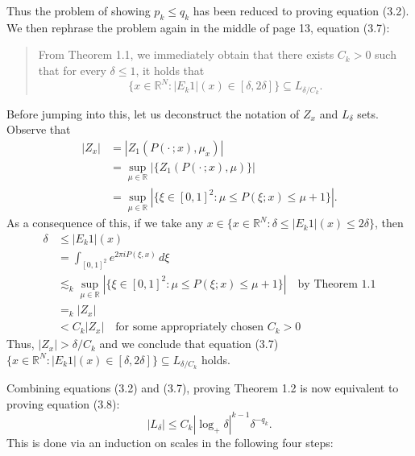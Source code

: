 \documentclass[12pt]{article}
\theoremstyle{definition}
\theoremstyle{remark}
\numberwithin{equation}{section}
\begin{document}
Thus the problem of showing $p_k\leq q_k$ has been reduced to proving equation (3.2).
We then rephrase the problem again in the middle of page 13, equation (3.7):
    \begin{quote}
        From Theorem 1.1, we immediately obtain that there exists $C_k>0$ such that for every $\delta \leq 1$, it holds that
        \begin{equation*}
            \{x\in \mathbb{R}^N \colon |E_k1|(x)\in [\delta,2\delta]\} \subseteq L_{\delta/C_k}.
        \end{equation*}
    \end{quote}
Before jumping into this, let us deconstruct the notation of $Z_x$ and $L_\delta$ sets. 
Observe that 
\begin{align*}
    |Z_x| &= |Z_1\left(P(\cdot\,;x),\mu_x\right)| \\
    &= \sup_{\mu\in\mathbb{R}}| \{Z_1\left(P(\cdot\,;x),\mu\right)\}| \\
    &= \sup_{\mu\in\mathbb{R}} | \{\xi\in[0,1]^2\colon \mu\leq P(\xi;x)\leq\mu+1\} |.
\end{align*}
As a consequence of this, if we take any $x\in \{x\in\mathbb{R}^N\colon \delta\leq |E_k1|(x)\leq 2\delta\}$, then 
\begin{align*}
    \delta &\leq |E_k1|(x) \\
    &= \int_{[0,1]^2} e^{2\pi i P(\xi,x)}\,d\xi \\
    &\lesssim_k \sup_{\mu\in\mathbb{R}} | \{\xi \in [0,1]^2\colon \mu \leq P(\xi;x)\leq \mu+1\} | \quad \textrm{by Theorem 1.1} \\
    &=_k |Z_x| \\
    &< C_k |Z_x| \quad\textrm{for some appropriately chosen $C_k>0$}
\end{align*}
Thus, $|Z_x| > \delta/C_k$ and we conclude that equation (3.7) $\{x\in\mathbb{R}^N\colon |E_k1|(x) \in [\delta,2\delta]\} \subseteq L_{\delta/C_k}$ holds. 


Combining equations (3.2) and (3.7), proving Theorem 1.2 is now equivalent to proving equation (3.8): 
$$|L_\delta| \leq C_k |\log_+\delta|^{k-1}\delta^{-q_k}.$$
This is done via an induction on scales in the following four steps:

\end{document}
